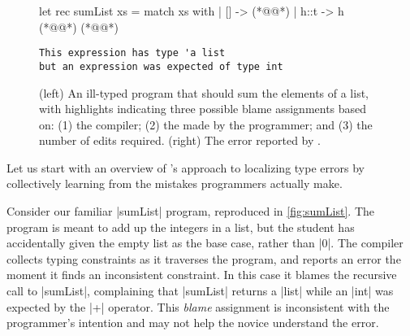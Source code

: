 \label{sec:nate:overview}


\begin{figure}[t!]
\small
\begin{minipage}{0.47\linewidth}
\begin{ecode}
  let rec sumList xs =
    match xs with
    | []   -> (*@\hlTree{\hlSherrloc{[]}}@*)
    | h::t -> h (*@\hlTree{+}@*) (*@@*)
\end{ecode}
\end{minipage}
\begin{minipage}{0.5\linewidth}
\begin{verbatim}
This expression has type 'a list
but an expression was expected of type int
\end{verbatim}
\end{minipage}
\caption{(left) An ill-typed \ocaml program that should sum the elements of a
  list, with highlights indicating three possible blame assignments based on:
  (1) the \hlFix{\ocaml} compiler;
  (2) the  made by the programmer; and
  (3)  the number of edits required.
  (right) The error reported by \ocaml.}
\label{fig:sumList}
\end{figure}


Let us start with an overview of \toolname's
approach to localizing type errors by
collectively learning from the mistakes
programmers actually make.

%
Consider our familiar |sumList| program, reproduced in
\autoref{fig:sumList}. %
%
The program is meant to add up the
integers in a list, but the student
has accidentally given the empty
list as the base case, rather than |0|.
%
The \ocaml compiler collects typing
constraints as it traverses the program,
and reports an error the moment it finds
an inconsistent constraint.
%
In this case it blames the recursive call
to |sumList|, complaining that |sumList|
returns a |list| while an |int| was
expected by the |+| operator.
%
This \emph{blame} assignment is inconsistent
with the programmer's intention and may
not help the novice understand the error.

